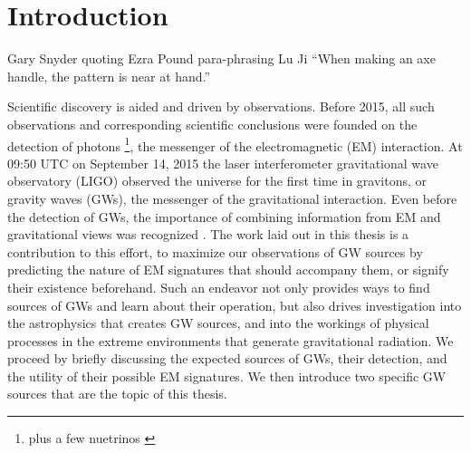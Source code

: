 \chapter[Introduction]{Introduction} \label{ch:intro}







\vspace{-16pt} \begin{chapquote}{Gary Snyder quoting Ezra Pound para-phrasing Lu Ji} \singlespacing ``When making an axe handle, the pattern is near at hand.'' 
 \end{chapquote} \vspace{-8pt}
\noindent\makebox[\linewidth]{\rule{0.5\textwidth}{0.5pt}} \vspace{1pt}




Scientific discovery is aided and driven by observations. Before 2015, all
such observations and corresponding scientific conclusions were founded on the
detection of photons \footnote{plus a few nuetrinos \citep{}}, the messenger
of the electromagnetic (EM) interaction. At 09:50 UTC on September 14, 2015
the laser interferometer gravitational wave observatory (LIGO) observed the
universe for the first time in gravitons, or gravity waves (GWs), the
messenger of the gravitational interaction. Even before the detection of GWs,
the importance of combining information from EM and gravitational views was
recognized \citep[\textit{See e.g.}][for some early discussions]{first EM
mentions}. The work laid out in this thesis is a contribution to this effort,
to maximize our observations of GW sources by predicting the nature of EM
signatures that should accompany them, or signify their existence beforehand.
Such an endeavor not only provides ways to find sources of GWs and learn about
their operation, but also drives investigation into the astrophysics that
creates GW sources, and into the workings of physical processes in the extreme
environments that generate gravitational radiation. We proceed by briefly
discussing the expected sources of GWs, their detection, and the utility of
their possible EM signatures. We then introduce two specific GW sources that
are the topic of this thesis.


